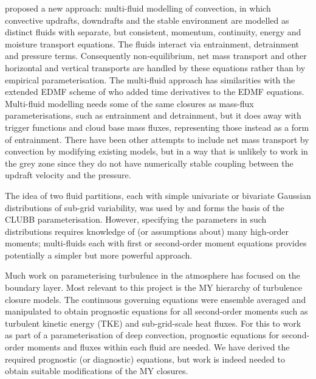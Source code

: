 \documentclass[11pt,a4paper]{article}
\begin{document}
\cite{TWV+18} proposed a new approach: multi-fluid modelling of convection, in which convective updrafts, downdrafts and the stable environment are modelled as distinct fluids with separate, but consistent, momentum, continuity, energy and moisture transport equations. The fluids interact via entrainment, detrainment and pressure terms. Consequently non-equilibrium, net mass transport and other horizontal and vertical transports are handled by these equations rather than by empirical parameterisation. The multi-fluid approach has similarities with the extended EDMF scheme of \cite{TKP+18} who added time derivatives to the EDMF equations. Multi-fluid modelling needs some of the same closures as mass-flux parameterisations, such as entrainment and detrainment, but it does away with trigger functions and cloud base mass fluxes, representing those instead as a form of entrainment. There have been other attempts to include net mass transport by convection \cite[]{KB08,MB19} by modifying existing models, but in a way that is unlikely to work in the grey zone since they do not have numerically stable coupling between the updraft velocity and the pressure.

The idea of two fluid partitions, each with simple univariate or bivariate Gaussian distributions of sub-grid variability, was used by \cite{GLC02} and forms the basis of the CLUBB parameterisation. However, specifying the parameters in such distributions requires knowledge of (or assumptions about) many high-order moments; multi-fluids each with first or second-order moment equations provides potentially a simpler but more powerful approach.

Much work on parameterising turbulence in the atmosphere has focused on the boundary layer. Most relevant to this project is the \citet{mellor1973,mellor1974,mellor1982} MY hierarchy of turbulence closure models. The continuous governing equations were ensemble averaged and manipulated to obtain prognostic equations for all second-order moments such as turbulent kinetic energy (TKE) and sub-grid-scale heat fluxes. For this to work as part of a parameterisation of deep convection, prognostic equations for second-order moments and fluxes within each fluid are needed. We have derived the required prognostic (or diagnostic) equations, but work is indeed needed to obtain suitable modifications of the MY closures.
\end{document}
